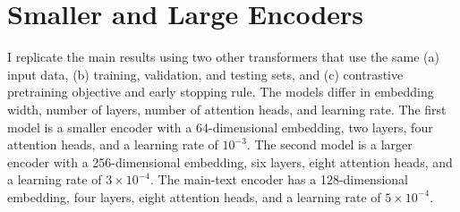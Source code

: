 \documentclass[11pt, letterpaper]{article}
\begin{document}

\section{Smaller and Large Encoders}
\label{app:sizes}
I replicate the main results using two other transformers that use the same (a) input data, (b) training, validation, and testing sets, and (c) contrastive pretraining objective and early stopping rule. The models differ in embedding width, number of layers, number of attention heads, and learning rate. The first model is a smaller encoder with a 64-dimensional embedding, two layers, four attention heads, and a learning rate of $10^{-3}$. The second model is a larger encoder with a 256-dimensional embedding, six layers, eight attention heads, and a learning rate of $3 \times 10^{-4}$. The main-text encoder has a 128-dimensional embedding, four layers, eight attention heads, and a learning rate of $5 \times 10^{-4}$.
\end{document}
